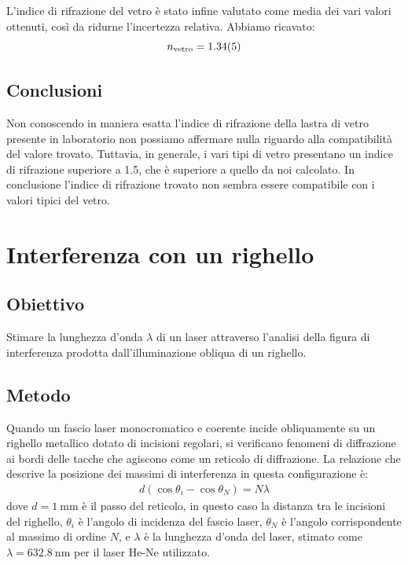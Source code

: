 \documentclass[a4paper]{article}
\begin{document}
L'indice di rifrazione del vetro è stato infine valutato come media dei vari valori ottenuti, così da ridurne l'incertezza relativa. Abbiamo ricavato:
\[n_{\text{vetro}}=\num{1.34 \pm 0.05}\]

\subsection{Conclusioni}
Non conoscendo in maniera esatta l'indice di rifrazione della lastra di vetro presente in laboratorio non possiamo affermare nulla riguardo alla compatibilità del valore trovato. Tuttavia, in generale, i vari tipi di vetro presentano un indice di rifrazione superiore a \num{1.5}, che è superiore a quello da noi calcolato. In conclusione l'indice di rifrazione trovato non sembra essere compatibile con i valori tipici del vetro.

\section{Interferenza con un righello}
\subsection{Obiettivo}
Stimare la lunghezza d'onda $\lambda$ di un laser attraverso l'analisi della figura di interferenza prodotta dall'illuminazione obliqua di un righello. 

\subsection{Metodo}
Quando un fascio laser monocromatico e coerente incide obliquamente su un righello metallico dotato di incisioni regolari, si verificano fenomeni di diffrazione ai bordi delle tacche che agiscono come un reticolo di diffrazione. La relazione che descrive la posizione dei massimi di interferenza in questa configurazione è: 
\begin{align}
    d(\cos\theta_i - \cos\theta_N) = N\lambda
\end{align}
dove $d=\SI{1}{\milli\meter}$ è il passo del reticolo, in questo caso la distanza tra le incisioni del righello, $\theta_i$ è l'angolo di incidenza del fascio laser, $\theta_N$ è l'angolo corrispondente al massimo di ordine $N$, e $\lambda$ è la lunghezza d'onda del laser, stimato come $\lambda=\SI{632.8}{\nano\meter}$ per il laser He-Ne utilizzato.
\end{document}
